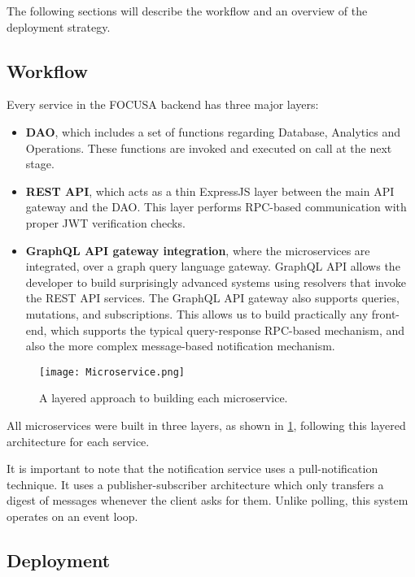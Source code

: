 The following sections will describe the workflow and an overview of the deployment strategy.

\subsection{Workflow}

Every service in the FOCUSA backend has three major layers:
\begin{itemize}
    \item \textbf{DAO}, which includes a set of functions regarding Database, Analytics and Operations. 
    These functions are invoked and executed on call at the next stage.
    \item \textbf{REST API}, which acts as a thin ExpressJS layer between the main API gateway and the DAO.
    This layer performs RPC-based communication with proper JWT verification checks.
    \item \textbf{GraphQL API gateway integration}, where the microservices are integrated, over a graph query language gateway.
    GraphQL API allows the developer to build surprisingly advanced systems using resolvers that invoke the REST API services.
    The GraphQL API gateway also supports queries, mutations, and subscriptions. This allows us to build practically any front-end, which supports the typical query-response RPC-based mechanism, and also the more complex message-based notification mechanism.
\end{itemize}

\begin{figure}[h!]
    \begin{center}
        \texttt{[image: Microservice.png]}
    \end{center}
    \caption{A layered approach to building each microservice.}
    \label{fig:microservice}
\end{figure}

All microservices were built in three layers, as shown in \ref{fig:microservice}, following this layered architecture for each service. 

It is important to note that the notification service uses a pull-notification technique. It uses a 
publisher-subscriber architecture which only transfers a digest of messages whenever the client asks for them. Unlike polling, 
this system operates on an event loop.

\subsection{Deployment}

